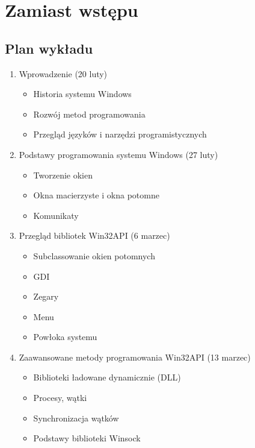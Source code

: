 ﻿\chapter*{Zamiast wstępu}

\section*{Plan wykładu}

\begin{enumerate}

\item Wprowadzenie (20 luty)
	\begin{itemize}
	\item Historia systemu Windows
	\item Rozwój metod programowania
	\item Przegląd języków i narzędzi programistycznych
	\end{itemize}
\item Podstawy programowania systemu Windows (27 luty)
	\begin{itemize}
	\item Tworzenie okien 
	\item Okna macierzyste i okna potomne
	\item Komunikaty 
	\end{itemize}
\item Przegląd bibliotek Win32API (6 marzec)
	\begin{itemize}
	\item Subclassowanie okien potomnych
	\item GDI
	\item Zegary
	\item Menu
	\item Powłoka systemu
	\end{itemize}
\item Zaawansowane metody programowania Win32API (13 marzec)
	\begin{itemize}
	\item Biblioteki ładowane dynamicznie (DLL)
	\item Procesy, wątki
	\item Synchronizacja wątków
	\item Podstawy biblioteki Winsock
	\end{itemize}


\end{enumerate}
